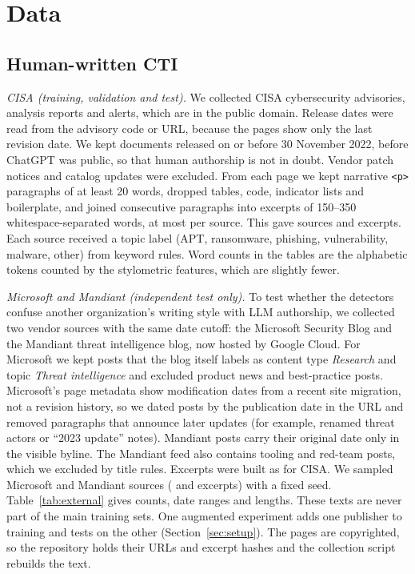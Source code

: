 \documentclass[journal]{IEEEtran}
\begin{document}
\section{Data}\label{sec:data}

\subsection{Human-written CTI}
\emph{CISA (training, validation and test).} We collected CISA cybersecurity advisories, analysis reports and
alerts, which are in the public domain. Release dates were read from the advisory code or URL, because the pages
show only the last revision date. We kept documents released on or before 30 November 2022, before ChatGPT was
public, so that human authorship is not in doubt. Vendor patch notices and catalog updates were excluded. From each
page we kept narrative \texttt{<p>} paragraphs of at least 20 words, dropped tables, code, indicator lists and
boilerplate, and joined consecutive paragraphs into excerpts of 150--350 whitespace-separated words, at most
\MaxChunks{} per source. This gave \NSources{} sources and \NHumanChunks{} excerpts. Each source received a topic
label (APT, ransomware, phishing, vulnerability, malware, other) from keyword rules. Word counts in the tables are
the alphabetic tokens counted by the stylometric features, which are slightly fewer.

\emph{Microsoft and Mandiant (independent test only).} To test whether the detectors confuse another organization's
writing style with LLM authorship, we collected two vendor sources with the same date cutoff: the Microsoft Security
Blog and the Mandiant threat intelligence blog, now hosted by Google Cloud. For Microsoft we kept posts that the
blog itself labels as content type \emph{Research} and topic \emph{Threat intelligence} and excluded product news
and best-practice posts. Microsoft's page metadata show modification dates from a recent site migration, not a
revision history, so we dated posts by the publication date in the URL and removed paragraphs that announce later
updates (for example, renamed threat actors or ``2023 update'' notes). Mandiant posts carry their original date only
in the visible byline. The Mandiant feed also contains tooling and red-team posts, which we excluded by title rules.
Excerpts were built as for CISA. We sampled \NExtSourcesMicrosoft{} Microsoft and \NExtSourcesMandiant{} Mandiant
sources (\NExtChunksMicrosoft{} and \NExtChunksMandiant{} excerpts) with a fixed seed. Table~\ref{tab:external}
gives counts, date ranges and lengths. These texts are never part of the main training sets. One augmented
experiment adds one publisher to training and tests on the other (Section~\ref{sec:setup}). The pages are
copyrighted, so the repository holds their URLs and excerpt hashes and the collection script rebuilds the text.
\end{document}

